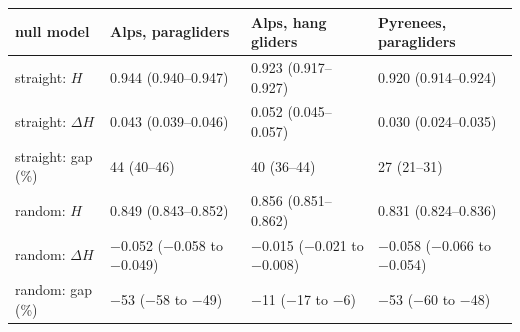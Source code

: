 \begin{tabular}{llll}
\toprule
null model & Alps, paragliders & Alps, hang gliders & Pyrenees, paragliders \\
\midrule
straight: $H$ & 0.944 (0.940--0.947) & 0.923 (0.917--0.927) & 0.920 (0.914--0.924) \\
straight: $\Delta H$ & 0.043 (0.039--0.046) & 0.052 (0.045--0.057) & 0.030 (0.024--0.035) \\
straight: gap (\%) & 44 (40--46) & 40 (36--44) & 27 (21--31) \\
random: $H$ & 0.849 (0.843--0.852) & 0.856 (0.851--0.862) & 0.831 (0.824--0.836) \\
random: $\Delta H$ & $-$0.052 ($-$0.058 to $-$0.049) & $-$0.015 ($-$0.021 to $-$0.008) & $-$0.058 ($-$0.066 to $-$0.054) \\
random: gap (\%) & $-$53 ($-$58 to $-$49) & $-$11 ($-$17 to $-$6) & $-$53 ($-$60 to $-$48) \\
\bottomrule
\end{tabular}
